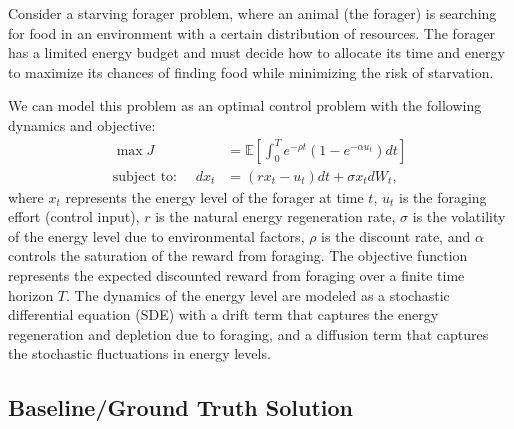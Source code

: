 Consider a starving forager problem, where an animal (the forager) is searching for food in an environment with a certain distribution of resources. The forager has a limited energy budget and must decide how to allocate its time and energy to maximize its chances of finding food while minimizing the risk of starvation.

We can model this problem as an optimal control problem with the following dynamics and objective:
\begin{align}
    \max J &= \mathbb{E}\left[ \int_{0}^{T} e^{-\rho t} (1 - e^{-\alpha u_{t}}) dt \right] \label{eq:forager:objective}\\
    \text{subject to: } \quad dx_{t} &= (r x_{t} - u_{t})dt + \sigma x_{t} dW_{t} \label{eq:forager:dynamics},
\end{align}
where $x_{t}$ represents the energy level of the forager at time $t$, $u_{t}$ is the foraging effort (control input), $r$ is the natural energy regeneration rate, $\sigma$ is the volatility of the energy level due to environmental factors, $\rho$ is the discount rate, and $\alpha$ controls the saturation of the reward from foraging. The objective function represents the expected discounted reward from foraging over a finite time horizon $T$. The dynamics of the energy level are modeled as a stochastic differential equation (SDE) with a drift term that captures the energy regeneration and depletion due to foraging, and a diffusion term that captures the stochastic fluctuations in energy levels.

\subsection{Baseline/Ground Truth Solution}
